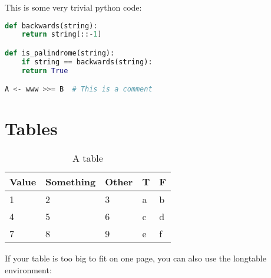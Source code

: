 \documentclass{jcls}
\begin{document}
This is some very trivial python code: 

\begin{lstlisting}[language=Python]
def backwards(string):
    return string[::-1]

def is_palindrome(string):
    if string == backwards(string): 
	return True

A <- www >>= B  # This is a comment
\end{lstlisting}

\section{Tables}

\begin{table}[ht]
\begin{tabular}{@{}lllll@{}}
\toprule
Value & Something & Other & T & F \\ \midrule
1     & 2         & 3     & a & b \\
4     & 5         & 6     & c & d \\
7     & 8         & 9     & e & f \\ \bottomrule
\end{tabular}
\caption{A table}
\end{table}

If your table is too big to fit on one page, you can also use the longtable environment:
\end{document}
